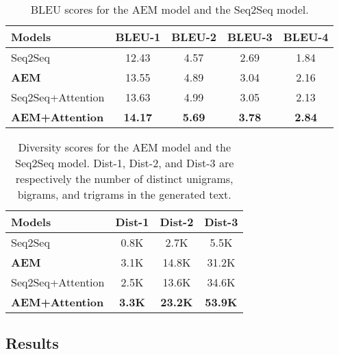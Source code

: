\documentclass[11pt,a4paper]{article}
\begin{document}
\begin{CJK}{UTF8}{song}
\begin{table*}[t]
\setlength{\tabcolsep}{1pt}
\centering
    \begin{tabular}{l|c|c|c|c}
    \hline


   Models &BLEU-1 &BLEU-2 &BLEU-3 &BLEU-4 \\ \hline
    Seq2Seq & 12.43& 4.57 & 2.69&1.84 \\
    \textbf{AEM} & 13.55& 4.89 &3.04&2.16 \\ \hline
    Seq2Seq+Attention & 13.63 & 4.99 &3.05&2.13 \\
    \textbf{AEM+Attention} &\textbf{14.17} & \textbf{5.69} &\textbf{3.78}& \textbf{2.84}\\
    \hline
    \end{tabular}

    \caption{BLEU scores for the AEM model and the Seq2Seq model. }
    \label{tab:state}
        
\end{table*}



\begin{table*}[t]
\centering
    \begin{tabular}{l|c|c|c}
    \hline


Models &  Dist-1  & Dist-2 & Dist-3 \\ \hline
  Seq2Seq  &0.8K & 2.7K & 5.5K               \\ 
    \textbf{AEM}  & 3.1K& 14.8K & 31.2K             \\ \hline
    Seq2Seq+Attention  & 2.5K& 13.6K & 34.6K             \\ 
     \textbf{AEM+Attention}  & \textbf{3.3K} & \textbf{23.2K} & \textbf{53.9K}             \\ 
  \hline
    
    
    \end{tabular}
    \caption{Diversity scores for the AEM model and the Seq2Seq model. Dist-1, Dist-2, and Dist-3 are respectively the number of distinct unigrams, bigrams, and trigrams in the generated text.  }
    \label{tab:auto-div}
\end{table*}


\subsection{Results}




\begin{table}[t]
\centering
\setlength{\tabcolsep}{2pt}
    \begin{tabular}{l|c|c|c}
    \hline
   



\end{tabular}
\end{table}
\end{CJK}
\end{document}
